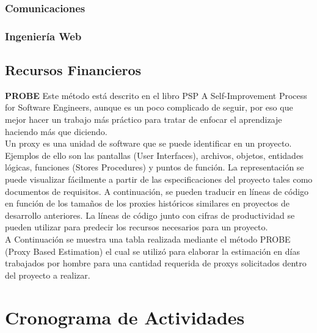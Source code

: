 \subsubsection*{Comunicaciones}

\subsubsection*{Ingenier\'ia Web}


\subsection{Recursos Financieros} 
\textbf{PROBE}
\newline
Este método est\'a descrito en el libro PSP A Self-Improvement Process for Software Engineers, aunque es un poco complicado de seguir, por eso que mejor hacer un trabajo m\'as pr\'actico para tratar de enfocar el aprendizaje haciendo m\'as que diciendo.\\

Un proxy es una unidad de software que se puede identificar en un proyecto. Ejemplos de ello son las pantallas (User Interfaces), archivos, objetos, entidades l\'ogicas, funciones (Stores Procedures) y puntos de funci\'on. La representaci\'on se puede visualizar f\'acilmente a partir de las especificaciones del proyecto tales como documentos de requisitos. A continuaci\'on, se pueden traducir en l\'ineas de c\'odigo en funci\'on de los tamaños de los proxies hist\'oricos similares en proyectos de desarrollo anteriores. La l\'ineas de c\'odigo junto con cifras de productividad se pueden utilizar para predecir los recursos necesarios para un proyecto.\\

A Continuaci\'on se muestra una tabla realizada mediante el m\'etodo PROBE (Proxy Based Estimation) el cual se utiliz\'o para elaborar la estimaci\'on en d\'ias trabajados por hombre para una cantidad requerida de proxys solicitados dentro del proyecto a realizar.

\section{Cronograma de Actividades}
